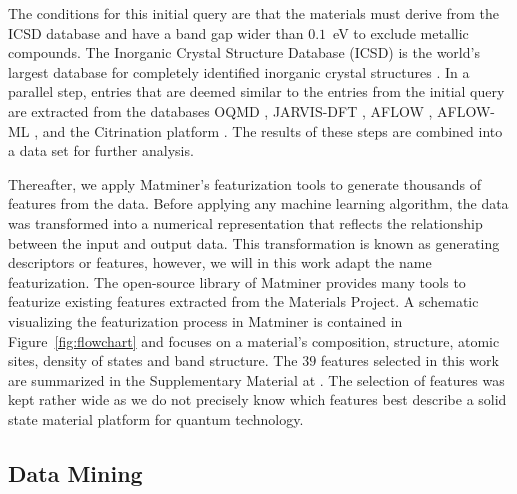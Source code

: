 \documentclass[superscriptaddress,unsortedaddress,
 amsmath,amssymb,
 aps,
]{revtex4-2}
\begin{document}
The conditions for this initial query are that the materials must derive from 
the ICSD database 
and have a band gap wider than $0.1$~eV to exclude metallic compounds. 
The Inorganic Crystal Structure Database (ICSD) is the world's largest database for completely identified inorganic crystal structures \cite{Allen1987,Zagorac2019}.%
In a parallel step, entries that are deemed
similar to the entries from the initial query
are extracted from the databases OQMD \cite{Saal2013,Kirklin2015}, JARVIS-DFT \cite{Choudhary2020}, AFLOW \cite{Curtarolo2012, Curtarolo2012a, Calderon2015}, AFLOW-ML \cite{Isayev2017}, and the Citrination platform \cite{OMaraJordan2016MDIA}. The results of these steps are combined into a data set for further analysis. 

Thereafter, we apply Matminer’s \cite{Ward2018} featurization tools to generate thousands of features from the data. 
Before applying any machine learning algorithm, the data was transformed into a numerical representation that reflects the relationship between the input and output data. This transformation is known as generating descriptors 
or features, however, we will in this work adapt the name featurization. 
The open-source library of Matminer provides many tools to featurize existing features extracted from the Materials Project. 
A schematic visualizing the featurization process in Matminer is contained in Figure~\ref{fig:flowchart} 
and focuses on a material's composition,  structure, atomic sites, density of states and band structure. 
The $39$ features selected in this work are summarized in the Supplementary Material at \cite{supplementary}. The selection of features was kept rather wide as we do not precisely know which features best describe a solid state material platform for quantum technology. 

\subsection*{Data Mining}
\end{document}
